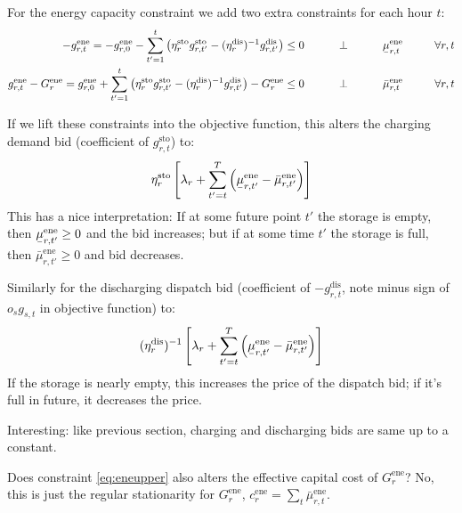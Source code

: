 \documentclass[final,3p,times]{elsarticle}
\newcommand{\ubar}[1]{\text{\b{$#1$}}}
\def\l{\lambda}
\begin{document}
For the energy capacity constraint  we add two extra constraints for each hour $t$:
\begin{align}
-g^{\textrm{ene}}_{r,t} =   -g^{\textrm{ene}}_{r,0} - \sum_{t'=1}^t \left( \eta^{\textrm{sto}}_r g^{\textrm{sto}}_{r,t'} - (\eta^{\textrm{dis}}_r)^{-1} g^{\textrm{dis}}_{r,t'} \right) \leq  0  \hspace{1cm}\perp \hspace{1cm} \ubar{\mu}^{\textrm{ene}}_{r,t} \hspace{1cm} \forall r,t \label{eq:enelower} \\
 g^{\textrm{ene}}_{r,t} - G^{\textrm{ene}}_r = g^{\textrm{ene}}_{r,0} + \sum_{t'=1}^t \left( \eta^{\textrm{sto}}_r g^{\textrm{sto}}_{r,t'} - (\eta^{\textrm{dis}}_r)^{-1} g^{\textrm{dis}}_{r,t'} \right) - G^{\textrm{ene}}_r \leq  0  \hspace{1cm}\perp \hspace{1cm} \bar{\mu}^{\textrm{ene}}_{r,t} \hspace{1cm} \forall r,t \label{eq:eneupper}
\end{align}


If we lift these constraints into the objective function, this alters the charging demand bid (coefficient of  $g^{\textrm{sto}}_{r,t}$) to:
\begin{equation}
   \eta^{\textrm{sto}}_r \left[ \l_r + \sum_{t'=t}^T \left( \ubar{\mu}^{\textrm{ene}}_{r,t'} -\bar{\mu}^{\textrm{ene}}_{r,t'}  \right) \right]
\end{equation}
This has a nice interpretation: If at some future point $t'$ the storage is empty, then $\ubar{\mu}^{\textrm{ene}}_{r,t'} \geq 0$  and the bid increases; but if at some time $t'$ the storage is full, then
$\bar{\mu}^{\textrm{ene}}_{r,t'} \geq 0$ and bid decreases.

Similarly for the discharging dispatch bid (coefficient of  $-g^{\textrm{dis}}_{r,t}$, note minus sign of $o_sg_{s,t}$ in objective function) to:
\begin{equation}
   (\eta^{\textrm{dis}}_r)^{-1}\left[ \l_r + \sum_{t'=t}^T \left(\ubar{\mu}^{\textrm{ene}}_{r,t'} - \bar{\mu}^{\textrm{ene}}_{r,t'}  \right)\right]
\end{equation}
If the storage is nearly empty, this increases the price of the dispatch bid; if it's full in future, it decreases the price.

Interesting: like previous section, charging and discharging bids are same up to a constant.

Does constraint \eqref{eq:eneupper} also alters the effective capital cost of $G^{\textrm{ene}}_r$? No, this is just the regular stationarity for $G^{\textrm{ene}}_r$, $ c^{\textrm{ene}}_r = \sum_t \bar{\mu}^{\textrm{ene}}_{r,t}$.
\end{document}
